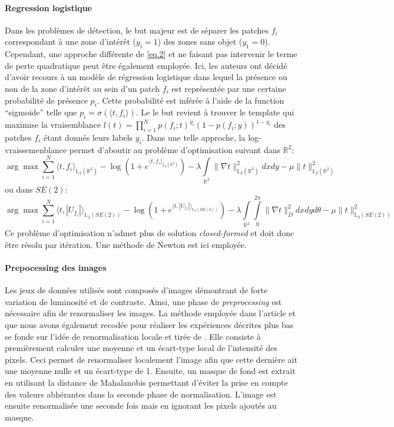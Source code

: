 \documentclass{article}
\begin{document}
\paragraph{Regression logistique}
Dans les problèmes de détection, le but majeur est de séparer les patches $f_i$ correspondant à une 
zone d'intérêt ($y_i =1$) des zones sans objet ($y_1=0$). Cependant, une approche différente de \ref{eq.2} et ne faisant pas intervenir le terme de perte quadratique 
peut être également employée. Ici, les auteurs ont décidé d'avoir recours à un modèle de régression logistique dans lequel la présence ou non de 
la zone d'intérêt au sein d'un patch $f_i$ est représentée par une certaine probabilité de présence $p_i$. Cette probabilité est inférée à l'aide de
la function ``sigmoide'' telle que $p_i = \sigma(\langle t, f_i \rangle)$. Le le but revient à trouver le template qui maximise la vraisemblance $l(t) = 
\prod \limits_{i=1}^N p(f_i; t)^{y_i}(1 - p(f_i; y))^{1- y_i}$
des patches $f_i$ étant donnés leurs labels $y_i$. Dans une telle approche, la log-vraissemenblance permet d'aboutir au problème d'optimisation suivant
dans $\mathbb{R}^2$:
\[
    \arg \max \sum \limits_{i=1}^N \langle t, f_i \rangle_{\mathbb{L}_2(\mathbb{R}^2)} - \log \left ( 1 + e^{\langle t, f_i \rangle_{\mathbb{L}_2(\mathbb{R}^2)}}\right) - \lambda \int \limits_{\mathbb{R}^2} \lVert \nabla 
    t \rVert_{\mathbb{L}_2(\mathbb{R}^2)}^2 dx dy - \mu \lVert t \rVert_{\mathbb{L}_2(\mathbb{R}^2)}^2
\]
ou dans $SE(2)$:
\[
    \arg \max \sum \limits_{i=1}^N \langle t, |U_{f_i}| \rangle_{\mathbb{L}_2(SE(2))} - \log \left ( 1 + e^{\langle t, |U_{f_i}| \rangle_{\mathbb{L}_2(SE(2))}}\right) - \lambda \int \limits_{\mathbb{R}^2} \int \limits_{0}^{2\pi}\lVert \nabla 
    t \rVert_{D}^2 dx dy d\theta- \mu \lVert t \rVert_{\mathbb{L}_2(SE(2))}^2
\]
Ce problème d'optimisation n'admet plus de solution \textit{closed-formed} et doit donc être résolu par itération. Une méthode de Newton est ici employée. 

\paragraph{Prepocessing des images}
Les jeux de données utilisés sont composés d'images démontrant de forte variation de luminosité et de contraste. Ainsi, une 
phase de \textit{preprocessing} est nécessaire afin de renormaliser les images. La méthode employée dans l'article et que nous 
avons également recodée pour réaliser les expériences décrites plus bas se fonde sur l'idée de renormalisation locale et tirée de \cite{preprocessing}. Elle consiste
à premièrement calculer une moyenne et un écart-type local de l'intensité des pixels. Ceci permet de renormaliser localement l'image afin 
que cette dernière ait une moyenne nulle et un écart-type de 1. Ensuite, un masque de fond est extrait en utilisant la distance de Mahalanobis 
permettant d'éviter la prise en compte des valeurs abhérantes dans la seconde phase de normalisation. L'image est ensuite renormalisée une seconde 
fois mais en ignorant les pixels ajoutés au masque.
\end{document}
